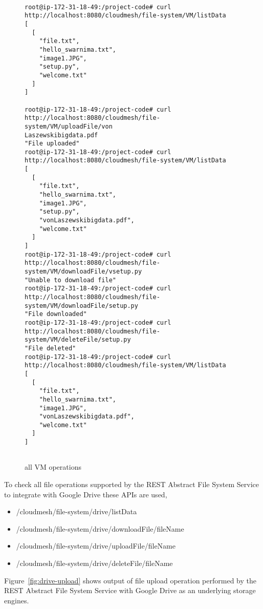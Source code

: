\begin{figure*}[!ht]
\begin{footnotesize}
\begin{verbatim}

root@ip-172-31-18-49:/project-code# curl 
http://localhost:8080/cloudmesh/file-system/VM/listData
[
  [
    "file.txt",
    "hello_swarnima.txt",
    "image1.JPG",
    "setup.py",
    "welcome.txt"
  ]
]

root@ip-172-31-18-49:/project-code# curl 
http://localhost:8080/cloudmesh/file-system/VM/uploadFile/von
Laszewskibigdata.pdf
"File uploaded"
root@ip-172-31-18-49:/project-code# curl 
http://localhost:8080/cloudmesh/file-system/VM/listData                    
[
  [
    "file.txt",
    "hello_swarnima.txt",
    "image1.JPG",
    "setup.py",
    "vonLaszewskibigdata.pdf",
    "welcome.txt"
  ]
]
root@ip-172-31-18-49:/project-code# curl 
http://localhost:8080/cloudmesh/file-system/VM/downloadFile/vsetup.py
"Unable to download file"
root@ip-172-31-18-49:/project-code# curl 
http://localhost:8080/cloudmesh/file-system/VM/downloadFile/setup.py
"File downloaded"
root@ip-172-31-18-49:/project-code# curl 
http://localhost:8080/cloudmesh/file-system/VM/deleteFile/setup.py
"File deleted"
root@ip-172-31-18-49:/project-code# curl 
http://localhost:8080/cloudmesh/file-system/VM/listData
[
  [
    "file.txt",
    "hello_swarnima.txt",
    "image1.JPG",
    "vonLaszewskibigdata.pdf",
    "welcome.txt"
  ]
]


\end{verbatim}
\end{footnotesize}
\caption{all VM operations}\label{fig:VM}
\end{figure*}


To check all file operations supported by the REST Abstract File
System Service to integrate with Google Drive these APIs are used,

\begin{itemize}

    \item /cloudmesh/file-system/drive/listData
    \item /cloudmesh/file-system/drive/downloadFile/{fileName}
    \item /cloudmesh/file-system/drive/uploadFile/{fileName}
    \item /cloudmesh/file-system/drive/deleteFile/{fileName}

\end{itemize}

Figure~\ref{fig:drive-upload} shows output of file upload operation
performed by the REST Abstract File System Service with Google Drive
as an underlying storage engines.

